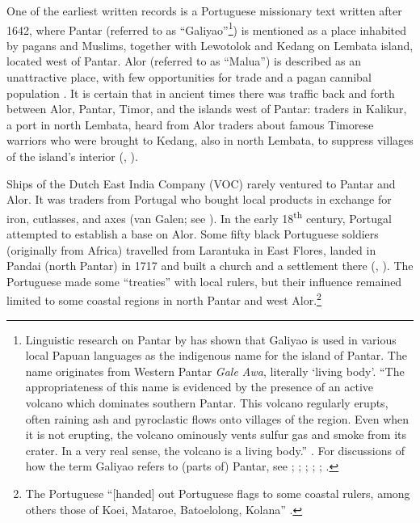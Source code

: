 One of the earliest written records is a Portuguese missionary text written after 1642, where Pantar (referred to as ``Galiyao''\footnote{Linguistic
 research on Pantar by \citet{Holton2010galiyao} has shown that Galiyao is used in various local Papuan languages as the indigenous name for the island of Pantar. The name originates from Western Pantar \textit{Gale Awa}, literally `living body'. ``The appropriateness of this name is evidenced by the presence of an active volcano which dominates southern Pantar. This volcano regularly erupts, often raining ash and pyroclastic flows onto villages of the region. Even when it is not erupting, the volcano ominously vents sulfur gas and smoke from its crater. In a very real sense, the volcano is a living body.'' \citep{Holton2010galiyao}. 
 For discussions of how the term Galiyao refers to (parts of) Pantar, see \citet[47]{LeRoux1929}; \citet[407]{Barnes1982majapahit}; \citet{Dietrich1984}; \citet{Rodemeier1995}; \citet[277]{Barnes2001}; \citet{Rodemeier2006}.})
is mentioned as a place inhabited by pagans and Muslims, together with Lewotolok and Kedang on Lembata island, located west of Pantar. Alor (referred to as ``Malua'') is described as an unattractive place, with few opportunities for trade and a pagan cannibal population \citep[179]{Hagerdal2012}. It is certain that in ancient times there was traffic back and forth between Alor, Pantar, Timor, and the islands west of Pantar: traders in Kalikur, a port in north Lembata, heard from Alor traders about famous Timorese warriors who were brought to Kedang, also in north Lembata, to suppress villages of the island's interior (\citealt[10.12]{Barnes1974}, \citealt[14]{LeRoux1929}). 

Ships of the Dutch East India Company (VOC) rarely ventured to Pantar and Alor. It was traders from Portugal who bought local products in exchange for iron, cutlasses, and axes (van Galen; see \citealt[17]{Hagerdal2010galens1}). In the early 18\textsuperscript{th} century, Portugal attempted to establish a base on Alor. Some fifty black Portuguese soldiers (originally from Africa) travelled from Larantuka in East Flores, landed in Pandai (north Pantar) in 1717 and built a church and a settlement there (\citealt[297]{Coolhaas1979}, \citealt[78]{Rodemeier2006}). The Portuguese made some ``treaties'' with 
local rulers, but their influence remained limited to some coastal regions in north Pantar and west Alor.\footnote{The Portuguese ``[handed] out Portuguese flags to some coastal rulers, among others those of Koei, Mataroe, Batoelolong, Kolana'' \citep[2]{VanGaalen1945}.} 

